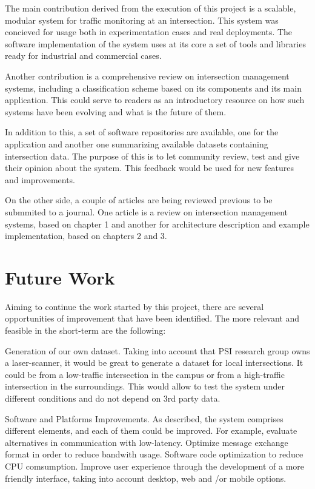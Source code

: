 The main contribution derived from the execution of this project is a scalable, modular system for traffic monitoring at an intersection. This system was concieved for usage both in experimentation cases and real deployments. The software implementation of the system uses at its core a set of tools and libraries ready for industrial and commercial cases.

Another contribution is a comprehensive review on intersection management systems, including a classification scheme based on its components and its main application. This could serve to readers as an introductory resource on how such systems have been evolving and what is the future of them.

In addition to this, a set of software repositories are available, one for the application and another one summarizing available datasets containing intersection data. The purpose of this is to let community review, test and give their opinion about the system. This feedback would be used for new features and improvements. 

On the other side, a couple of articles are being reviewed previous to be submmited to a journal. One article is a review on intersection management systems, based on chapter 1 and another for architecture description and example implementation, based on chapters 2 and 3.

\section{Future Work}

Aiming to continue the work started by this project, there are several opportunities of improvement that have been identified. The more relevant and feasible in the short-term are the following:

Generation of our own dataset. Taking into account that PSI research group owns a laser-scanner, it would be great to generate a dataset for local intersections. It could be from a low-traffic intersection in the campus or from a high-traffic intersection in the surroundings. This would allow to test the system under different conditions and do not depend on 3rd party data.

Software and Platforms Improvements. As described, the system comprises different elements, and each of them could be improved. For example, evaluate alternatives in communication with low-latency. Optimize message exchange format in order to reduce bandwith usage. Software code optimization to reduce CPU comsumption. Improve user experience through the development of a more friendly interface, taking into account desktop, web and /or mobile options.

